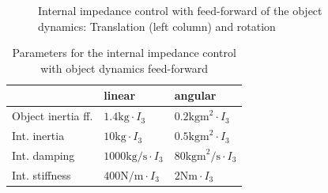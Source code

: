 \documentclass[a4paper,twoside, openright,12pt]{report}
\begin{document}
%
\begin{figure}[h]

\label{FIG:DePaSim}
\caption[Simulation results: Internal impedance control with feed-forward of the object dynamics]{Internal impedance control with feed-forward of the object dynamics: Translation (left column) and rotation}
\end{figure}

\begin{table}
	\centering
	\caption[Parameters for the internal impedance control with object dynamics feed-forward]{Parameters for the internal impedance control with object dynamics feed-forward}\vspace{10pt}
	\label{TAB:DePaParameters}
	
	\begin{tabular}{ l | l | l }
	 & linear & angular \\ \hline
	Object inertia ff. & $1.4 \text{kg} \cdot I_3$ & $0.2 \text{kgm}^2 \cdot I_3$ \\ \hline
	Int. inertia & $10 \text{kg} \cdot I_3$ & $0.5 \text{kgm}^2 \cdot I_3$ \\ \hline
	Int. damping & $1000 \text{kg/s} \cdot I_3$ & $80 \text{kgm}^2 \text{/s} \cdot I_3 $ \\ \hline
	Int. stiffness & $400 \text{N/m} \cdot I_3$ & $2 \text{Nm} \cdot I_3$\\ \hline
\end{tabular}
\end{table}
\end{document}
